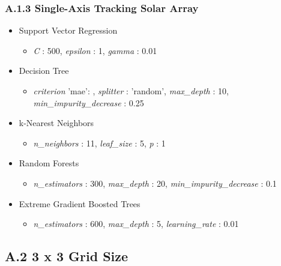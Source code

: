 \subsubsection*{A.1.3 \hspace{0.5em} Single-Axis Tracking Solar Array}
\begin{itemize}
    \item Support Vector Regression
    \begin{itemize}
        \item \textit{C} : 500, \textit{epsilon} : 1,  \textit{gamma} : 0.01
    \end{itemize}

    \item Decision Tree 
    \begin{itemize}
        \item \textit{criterion} 'mae': , \textit{splitter} : 'random', \textit{max\_depth} : 10, \textit{min\_impurity\_decrease} : 0.25
    \end{itemize}

    \item k-Nearest Neighbors 
    \begin{itemize}
        \item \textit{n\_neighbors} : 11, \textit{leaf\_size} : 5, \textit{p} : 1
    \end{itemize}

    \item Random Forests 
    \begin{itemize}
        \item \textit{n\_estimators} : 300, \textit{max\_depth} : 20, \textit{min\_impurity\_decrease} : 0.1
    \end{itemize}

    \item Extreme Gradient Boosted Trees
    \begin{itemize}
        \item \textit{n\_estimators} : 600, \textit{max\_depth} : 5, \textit{learning\_rate} : 0.01
    \end{itemize}

\end{itemize}

\subsection*{A.2 \hspace{0.5em} 3 x 3 Grid Size}
